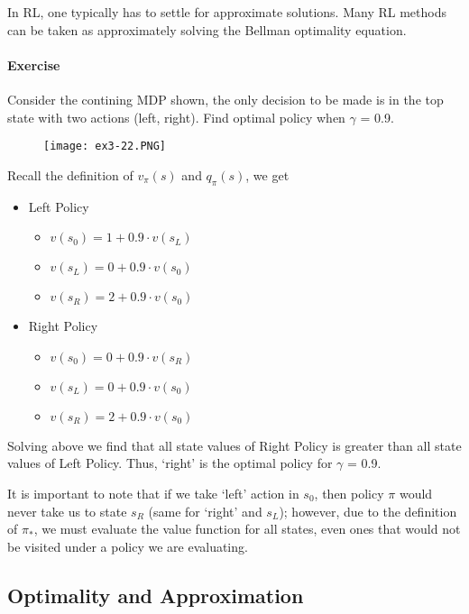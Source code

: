 \documentclass[lang=en,mode=geye,device=normal,color=blue,14pt]{elegantnote}
\DeclareMathOperator*{\1}{\mathbbm{1}}
\begin{document}
In RL, one typically has to settle for approximate solutions. Many RL methods can be taken as approximately solving the Bellman optimality equation.

\paragraph{Exercise} Consider the contining MDP shown, the only decision to be made is in the top state with two actions (left, right).
Find optimal policy when $\gamma$ = 0.9.

\begin{figure}[!h]
  \centering
  \texttt{[image: ex3-22.PNG]}
  \label{fig:ex3-22}
\end{figure}

Recall the definition of $v_\pi(s)$ and $q_\pi(s)$, we get

\begin{itemize}
\item Left Policy
\begin{itemize}
\item $ v(s_0) = 1 + 0.9\cdot v(s_L) $
\item $ v(s_L) = 0 + 0.9\cdot v(s_0) $
\item $ v(s_R) = 2 + 0.9\cdot v(s_0) $
\end{itemize}
\item Right Policy
\begin{itemize}
\item $ v(s_0) = 0 + 0.9\cdot v(s_R) $
\item $ v(s_L) = 0 + 0.9\cdot v(s_0) $
\item $ v(s_R) = 2 + 0.9\cdot v(s_0) $
\end{itemize}
\end{itemize}
Solving above we find that all state values of Right Policy is greater than all state values of Left Policy. Thus, `right' is the optimal policy for $\gamma$ = 0.9.

It is important to note that if we take `left' action in $s_0$, then policy $\pi$ would never take us to state $s_R$ (same for `right' and $s_L$); however, due to the definition of $\pi_*$, we must evaluate the value function for all states, even ones that would not be visited under a policy we are evaluating.

\subsection{Optimality and Approximation}
\end{document}
